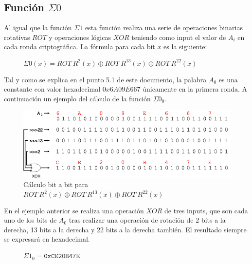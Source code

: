 \documentclass{article}
\begin{document}
    \subsection{Función $\Sigma0$}
        Al igual que la función $\Sigma1$ esta función realiza una serie de operaciones binarias rotativas $ROT$ y operaciones lógicas $XOR$ teniendo como input el valor de $A_{i}$ en cada ronda criptográfica. La fórmula para cada bit $x$ es la siguiente:
            \begin{figure}[H]
            \centering
                $\Sigma0(x) = ROT \ R^{2}(x) \oplus ROT \ R^{13}(x) \oplus ROT \ R^{22}(x)$
            \end{figure}
        Tal y como se explica en el punto 5.1 de este documento, la palabra $A_{0}$ es una constante con valor hexadecimal $0x6A09E667$ únicamente en la primera ronda. A continuación un ejemplo del cálculo de la función $\Sigma0_{0}$.
            \begin{figure}[H]
            \centering
                \includegraphics[scale=0.41]{img/SHA-256-function_Sigma0.png}
                \caption{Cálculo bit a bit para $ROT \ R^{2}(x) \oplus ROT \ R^{13}(x) \oplus ROT \ R^{22}(x)$}
            \end{figure}
        En el ejemplo anterior se realiza una operación $XOR$ de tres inputs, que son cada uno de los bits de $A_{0}$ tras realizar una operación de rotación de 2 bits a la derecha, 13 bits a la derecha y 22 bits a la derecha también. El resultado siempre se expresará en hexadecimal.
            \begin{figure}[H]
            \centering
                $\Sigma1_{0} = \texttt{0xCE20B47E}$
            \end{figure}
    
\end{document}
